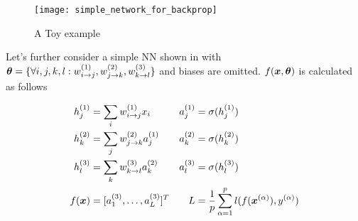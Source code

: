 \begin{figure}[ht!]
    \begin{center}
		\texttt{[image: simple\_network\_for\_backprop]}
		\caption[]{A Toy example}
		\label{fig:simple_network_for_backprop}
	\end{center}
\end{figure}


Let's further consider a simple NN shown in \addfigure{\ref{fig:simple_network_for_backprop}} with $\boldsymbol{\theta} = \{ \forall i,j,k,l : w^{(1)}_{i \rightarrow j}, w^{(2)}_{j \rightarrow k}, w^{(3)}_{k \rightarrow l}  \}$ and biases are omitted. $f(\boldsymbol{x}, \boldsymbol{\theta})$ is calculated as follows

\begin{align*}
		h_j^{(1)} &= \sum_i w_{i \rightarrow j}^{(1)} x_i & a_j^{(1)} &= \sigma (h_j^{(1)})	\\
		h_k^{(2)} &= \sum_j w_{j \rightarrow k}^{(2)} a_j^{(1)}  & a_k^{(2)} &= \sigma (h_k^{(2)})	 \\
		h_l^{(3)} &= \sum_k w_{k \rightarrow l}^{(3)} a_k^{(2)} & a_l^{(3)} &= \sigma (h_l^{(3)})	 \\
		f(\x) &= [ a_1^{(3)}, \dots, a_L^{(3)}  ]^T  & L &= \frac{1}{p} \sum_{\alpha = 1}^{p} l(f(\xa), \ya)	
\end{align*}

